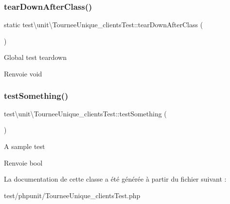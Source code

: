 \subsubsection{\texorpdfstring{tear\+Down\+After\+Class()}{tearDownAfterClass()}}
{\footnotesize\ttfamily static test\textbackslash{}unit\textbackslash{}\+Tournee\+Unique\+\_\+clients\+Test\+::tear\+Down\+After\+Class (\begin{DoxyParamCaption}{ }\end{DoxyParamCaption})\hspace{0.3cm}{\ttfamily [static]}}

Global test teardown \begin{DoxyReturn}{Renvoie}
void 
\end{DoxyReturn}
\mbox{\label{classtest_1_1unit_1_1TourneeUnique__clientsTest_ad351aaef5dc4be2d59c8fb28edb5014b}} 
\subsubsection{\texorpdfstring{test\+Something()}{testSomething()}}
{\footnotesize\ttfamily test\textbackslash{}unit\textbackslash{}\+Tournee\+Unique\+\_\+clients\+Test\+::test\+Something (\begin{DoxyParamCaption}{ }\end{DoxyParamCaption})}

A sample test \begin{DoxyReturn}{Renvoie}
bool 
\end{DoxyReturn}


La documentation de cette classe a été générée à partir du fichier suivant \+:\begin{DoxyCompactItemize}
\item 
test/phpunit/Tournee\+Unique\+\_\+clients\+Test.\+php\end{DoxyCompactItemize}
